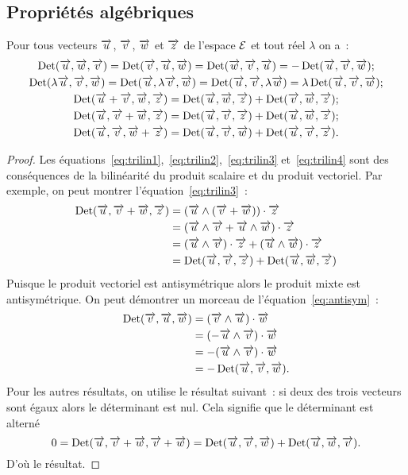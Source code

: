 \subsection{Propriétés algébriques}
\begin{prop}
  Pour tous vecteurs $\vu$, $\vv$, $\vw$ et $ \vz$ de l'espace $\E$ et tout réel $\lambda$ on a~:
  \begin{gather}    
    \Det(\vu,\vw,\vv)=\Det(\vv,\vu,\vw)=\Det(\vw,\vv,\vu)=-\Det(\vu,\vv,\vw)\label{eq:antisym};\\
    \Det(\lambda\vu,\vv,\vw)=\Det(\vu,\lambda\vv,\vw)=\Det(\vu,\vv,\lambda\vw)=\lambda\Det(\vu,\vv,\vw)\label{eq:trilin1};\\
    \Det(\vu+\vv,\vw,\vz)=\Det(\vu,\vw,\vz)+\Det(\vv,\vw,\vz)\label{eq:trilin2};\\
    \Det(\vu,\vv+\vw,\vz)=\Det(\vu,\vv,\vz)+\Det(\vu,\vw,\vz)\label{eq:trilin3};\\
    \Det(\vu,\vv,\vw+\vz)=\Det(\vu,\vv,\vw)+\Det(\vu,\vv,\vz)\label{eq:trilin4}.
  \end{gather}
\end{prop}
\begin{proof}
  Les équations~\eqref{eq:trilin1},~\eqref{eq:trilin2},~\eqref{eq:trilin3} et~\eqref{eq:trilin4} sont des conséquences de la bilinéarité du produit scalaire et du produit vectoriel. Par exemple, on peut montrer l'équation~\eqref{eq:trilin3}~:
  \begin{align}
    \Det(\vu,\vv+\vw,\vz)&=(\vu\wedge(\vv+\vw))\cdot\vz\\
    &=(\vu\wedge\vv+\vu\wedge\vw)\cdot\vz\\
    &=(\vu\wedge\vv)\cdot\vz+(\vu\wedge\vw)\cdot\vz\\
    &=\Det(\vu,\vv,\vz)+\Det(\vu,\vw,\vz)
  \end{align}
Puisque le produit vectoriel est antisymétrique alors le produit mixte est antisymétrique. On peut démontrer un morceau de l'équation~\eqref{eq:antisym}~:
\begin{align}
  \Det(\vv,\vu,\vw)&=(\vv\wedge\vu)\cdot\vw\\
  &=(-\vu\wedge\vv)\cdot\vw\\
  &=-(\vu\wedge\vv)\cdot\vw\\
  &=-\Det(\vu,\vv,\vw).
\end{align}
Pour les autres résultats, on utilise le résultat suivant~: si deux des trois vecteurs sont égaux alors le déterminant est nul. Cela signifie que le déterminant est alterné
\begin{equation}
  0=\Det(\vu,\vv+\vw,\vv+\vw)=\Det(\vu,\vv,\vw)+\Det(\vu,\vw,\vv).
\end{equation}
D'où le résultat.
\end{proof}
